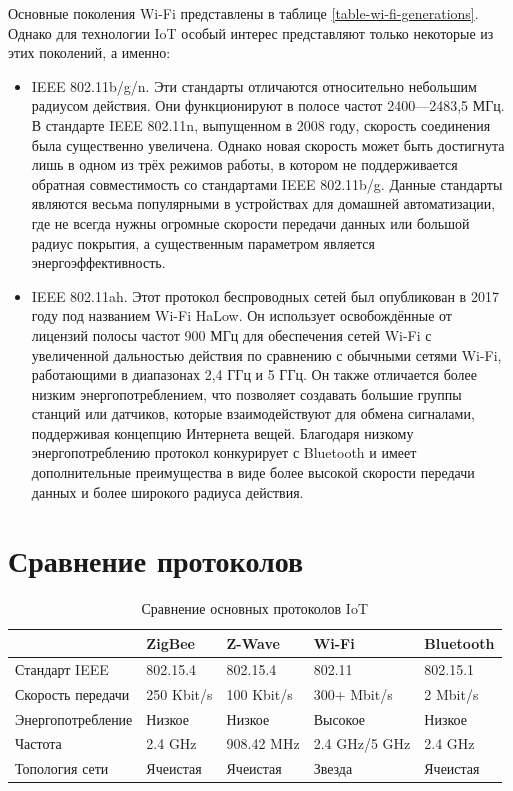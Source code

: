 	Основные поколения Wi-Fi представлены в таблице \ref{table-wi-fi-generations}. Однако для технологии 
	IoT особый интерес представляют только некоторые из этих поколений, а именно:
	
	\begin{itemize}
		\item IEEE 802.11b/g/n. Эти стандарты отличаются относительно небольшим радиусом действия.
		Они функционируют в полосе частот 2400—2483,5 МГц. В стандарте  IEEE 802.11n, выпущенном
		в 2008 году, скорость соединения была существенно увеличена. Однако новая скорость может
		быть достигнута лишь в одном из трёх режимов работы, в котором не поддерживается обратная
		совместимость со стандартами IEEE 802.11b/g. Данные стандарты являются весьма популярными
		в устройствах для домашней автоматизации, где не всегда нужны огромные скорости передачи
		данных или большой радиус покрытия, а существенным параметром является энергоэффективность.
		\item IEEE 802.11ah. Этот протокол беспроводных сетей был опубликован в 2017 году под названием 
		Wi-Fi HaLow. Он использует освобождённые от лицензий полосы частот 900 МГц для обеспечения 
		сетей Wi-Fi с увеличенной дальностью действия по сравнению с обычными сетями Wi-Fi, работающими 
		в диапазонах 2,4 ГГц и 5 ГГц. Он также отличается более низким энергопотреблением, что позволяет 
		создавать большие группы станций или датчиков, которые взаимодействуют для обмена сигналами, 
		поддерживая концепцию Интернета вещей. Благодаря низкому энергопотреблению протокол конкурирует 
		с Bluetooth и имеет дополнительные преимущества в виде более высокой скорости передачи данных 
		и более широкого радиуса действия.
	\end{itemize}
	
	
	\section{Сравнение протоколов}
	
	\begin{table}[h]
		\centering
		\begin{tabular}{ | l | l | l | l | l | }
			\hline
			 & ZigBee & Z-Wave & Wi-Fi & Bluetooth \\ \hline
			Стандарт IEEE & 802.15.4 & 802.15.4 & 802.11 & 802.15.1 \\ \hline
			Скорость передачи & 250 Kbit/s & 100 Kbit/s & 300+ Mbit/s & 2 Mbit/s \\ \hline
			Энергопотребление & Низкое & Низкое & Высокое & Низкое \\ \hline
			Частота & 2.4 GHz  & 908.42 MHz & 2.4 GHz/5 GHz & 2.4 GHz \\ \hline
			Топология сети & Ячеистая & Ячеистая & Звезда & Ячеистая \\
			\hline
		\end{tabular}
		\caption{Сравнение основных протоколов IoT}
		\label{table-IoT-protocols-comparison}
	\end{table}

